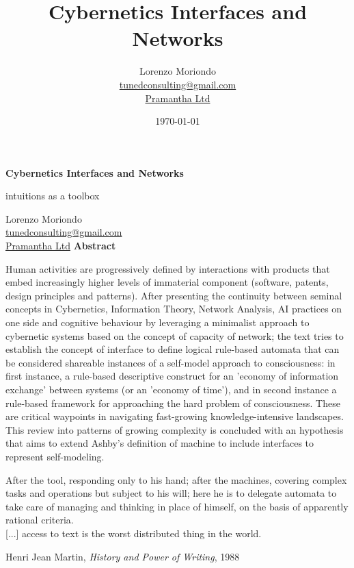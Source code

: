 \documentclass[14pt,a4paper]{extarticle}
\title{Cybernetics Interfaces and Networks}%
\author{Lorenzo Moriondo \\ \href{mailto:tunedconsulting@gmail.com}{tunedconsulting@gmail.com} \\ \href{https://pramantha.net}{Pramantha Ltd}}%
\date{\today}%
\begin{document}
%

\begin{titlepage}
	\begin{center}
    	\vspace*{1cm}
        \Huge
        \textbf{Cybernetics Interfaces and Networks}%

        \vspace{0.5cm}
        \LARGE{intuitions as a toolbox}
            
        \vspace{1.5cm}

        \normalsize{Lorenzo Moriondo \\ \href{mailto:tunedconsulting@gmail.com}{tunedconsulting@gmail.com} \\ \href{https://pramantha.net}{Pramantha Ltd}}
        \vfill
        \textbf{Abstract}
	\end{center}   
    \vspace{3mm}

	Human activities are progressively defined by interactions with products that embed increasingly higher levels of immaterial component (software, patents, design principles and patterns). After presenting the continuity between seminal concepts in Cybernetics, Information Theory, Network Analysis, AI practices on one side and cognitive behaviour by leveraging a minimalist approach to cybernetic systems based on the concept of capacity of network; the text tries to establish the concept of interface to define logical rule-based automata that can be considered shareable instances of a self-model approach to consciousness: in first instance, a rule-based descriptive construct for an 'economy of information exchange' between systems (or an 'economy of time'), and in second instance a rule-based framework for approaching the hard problem of consciousness. These are critical waypoints in navigating fast-growing knowledge-intensive landscapes. This review into patterns of growing complexity is concluded with an hypothesis that aims to extend Ashby's definition of machine to include interfaces to represent self-modeling.
\end{titlepage}%

\newpage

\pagestyle{header}%

\epigraph{
After the tool, responding only to his hand; after the machines, covering complex tasks and operations but subject to his will; here he is to delegate automata to take care of managing and thinking in place of himself, on the basis of apparently rational criteria.\\
\vspace{5mm}
[...] access to text is the worst distributed thing in the world.
}{Henri Jean Martin, \textit{History and Power of Writing}, 1988}
\end{document}
